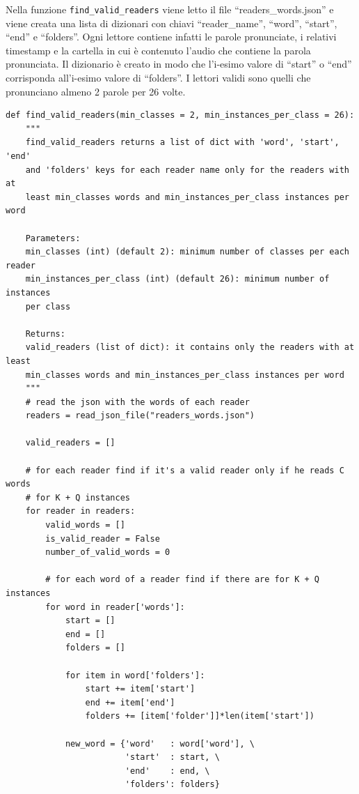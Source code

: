 \documentclass[12pt,a4paper,titlepage]{article}
\begin{document}
Nella funzione \texttt{find\_valid\_readers} viene letto il file ``readers\_words.json'' e viene creata una lista di dizionari con chiavi ``reader\_name'', ``word'', ``start'', ``end'' e ``folders''. Ogni lettore contiene infatti le parole pronunciate, i relativi timestamp e la cartella in cui è contenuto l'audio che contiene la parola pronunciata. Il dizionario è creato in modo che l'i-esimo valore di ``start'' o ``end'' corrisponda all'i-esimo valore di ``folders''. I lettori validi sono quelli che pronunciano almeno 2 parole per 26 volte.

\begin{lstlisting}[language=iPython,firstnumber=10, caption=Funzione \texttt{find\_valid\_readers}, label=find_valid_readers,captionpos=b]
def find_valid_readers(min_classes = 2, min_instances_per_class = 26):
    """
    find_valid_readers returns a list of dict with 'word', 'start', 'end'
    and 'folders' keys for each reader name only for the readers with at
    least min_classes words and min_instances_per_class instances per word

    Parameters:
    min_classes (int) (default 2): minimum number of classes per each reader
    min_instances_per_class (int) (default 26): minimum number of instances 
    per class

    Returns:
    valid_readers (list of dict): it contains only the readers with at least
    min_classes words and min_instances_per_class instances per word
    """
    # read the json with the words of each reader
    readers = read_json_file("readers_words.json")

    valid_readers = []

    # for each reader find if it's a valid reader only if he reads C words
    # for K + Q instances
    for reader in readers:    
        valid_words = []
        is_valid_reader = False
        number_of_valid_words = 0

        # for each word of a reader find if there are for K + Q instances
        for word in reader['words']:
            start = []
            end = []
            folders = []

            for item in word['folders']:
                start += item['start']
                end += item['end']
                folders += [item['folder']]*len(item['start'])

            new_word = {'word'   : word['word'], \
                        'start'  : start, \
                        'end'    : end, \
                        'folders': folders}


\end{lstlisting}
\end{document}
